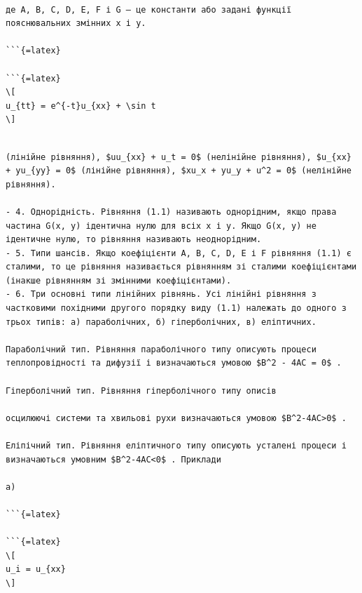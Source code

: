 \documentclass[
  ukrainian,
]{article}
\begin{document}
\begin{verbatim}

де A, B, C, D, E, F і G — це константи або задані функції пояснювальних змінних x і y.

```{=latex}

```{=latex}
\[
u_{tt} = e^{-t}u_{xx} + \sin t
\]
\end{verbatim}

\begin{verbatim}

(лінійне рівняння), $uu_{xx} + u_t = 0$ (нелінійне рівняння), $u_{xx} + yu_{yy} = 0$ (лінійне рівняння), $xu_x + yu_y + u^2 = 0$ (нелінійне рівняння).

- 4. Однорідність. Рівняння (1.1) називають однорідним, якщо права частина G(x, y) ідентична нулю для всіх x і y. Якщо G(x, y) не ідентичне нулю, то рівняння називають неоднорідним.
- 5. Типи шансів. Якщо коефіцієнти A, B, C, D, E і F рівняння (1.1) є сталими, то це рівняння називається рівнянням зі сталими коефіцієнтами (інакше рівнянням зі змінними коефіцієнтами).
- 6. Три основні типи лінійних рівнянь. Усі лінійні рівняння з частковими похідними другого порядку виду (1.1) належать до одного з трьох типів: а) параболічних, б) гіперболічних, в) еліптичних.

Параболічний тип. Рівняння параболічного типу описують процеси теплопровідності та дифузії і визначаються умовою $B^2 - 4AC = 0$ .

Гіперболічний тип. Рівняння гіперболічного типу описів

осцилюючі системи та хвильові рухи визначаються умовою $B^2-4AC>0$ .

Еліпічний тип. Рівняння еліптичного типу описують усталені процеси і визначаються умовним $B^2-4AC<0$ . Приклади

a)

```{=latex}

```{=latex}
\[
u_i = u_{xx}
\]
\end{verbatim}
\end{document}
